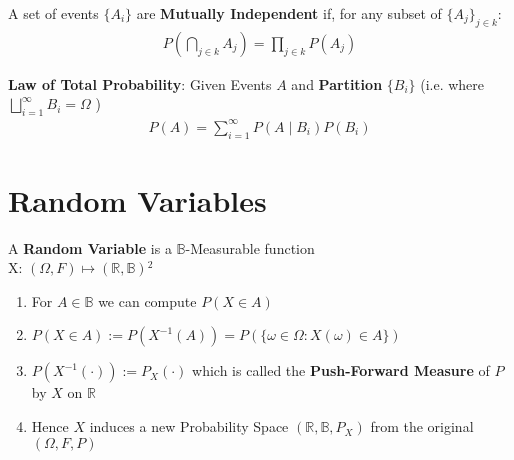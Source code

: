 \documentclass[a4paper,portrait,columns=2, hidelinks]{cheatsheet}
\begin{document}
A set of events \(\{A_i\}\) are \textbf{Mutually Independent} if, for any subset of \(\{A_j\}_{j\in k}\):
\begin{align*}
P \left( \bigcap_{j\in k} A_j \right) = \prod_{j\in k}P(A_j) 
\end{align*}

\textbf{Law of Total Probability}: Given Events \(A\) and \textbf{Partition} \(\{B_i\}\) (i.e. where \(\bigsqcup_{i=1}^{\infty} B_i = \Omega \) )
\begin{align*}
P(A) = \sum_{i=1}^{\infty} P(A \mid B_i)P(B_i)
\end{align*}

\section{Random Variables}

A \textbf{Random Variable} is a \(\mathbb{B}\)-Measurable function \\
X: \( (\Omega, F) \mapsto (\mathbb{R},\mathbb{B}) \)\hyperref[sec:ft1]{$^2$}
\begin{enumerate}
	\item For \( A \in \mathbb{B}\) we can compute \( P(X \in A)\)
	\item \( P(X \in A) := P(X^{-1}(A)) = P(\{ \omega \in \Omega : X(\omega) \in A \})\)
	\item \( P(X^{-1}(\cdot)) := P_X(\cdot)\) which is called the \textbf{Push-Forward Measure} of \(P\) by \(X\) on \( \mathbb{R}\)
	\item Hence \( X\) induces a new Probability Space \((\mathbb{R}, \mathbb{B}, P_X) \) from the original \( (\Omega, F, P)\)
\end{enumerate}

\end{document}
